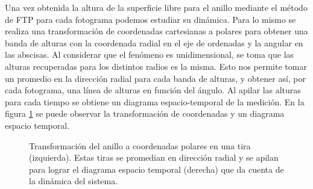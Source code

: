 \documentclass[../main.tex]{subfiles}
\begin{document}
Una vez obtenida la altura de la superficie libre para el anillo mediante el método de FTP para cada fotograma podemos estudiar su dinámica. Para lo mismo se realiza una transformación de coordenadas cartesianas a polares para obtener una banda de alturas con la coordenada radial en el eje de ordenadas y la angular en las abscisas. Al considerar que el fenómeno es unidimensional, se toma que las alturas recuperadas para los distintos radios es la misma. Esto nos permite tomar un promedio en la dirección radial para cada banda de alturas, y obtener así, por cada fotograma, una línea de alturas en función del 
ángulo. Al apilar las alturas para cada tiempo se obtiene un diagrama espacio-temporal de la medición. En la figura \ref{fig:polares_and_st} se puede observar la transformación de coordenadas y un diagrama espacio temporal. 

\begin{figure}[H]
    \centering
    \caption{Transformación del anillo a coordenadas polares en una tira (izquierda). Estas tiras se promedian en dirección radial y se apilan para lograr el diagrama espacio temporal (derecha) que da cuenta de la dinámica del sistema. }%
    \label{fig:polares_and_st}
\end{figure}
\end{document}

